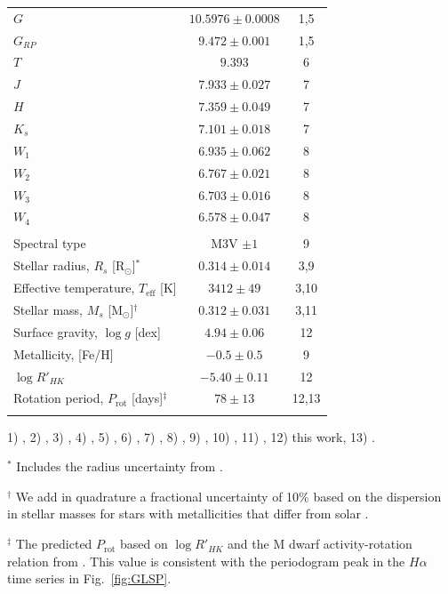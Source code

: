 \documentclass[longauth]{aa}
\newcommand{\prot}{$P_{\text{rot}}$}
\newcommand{\teff}{$T_{\text{eff}}$}
\begin{document}
\begin{table}[t]
\begin{tabular}{lcc}
    $G$ & $10.5976\pm 0.0008$ & 1,5 \\
    $G_{RP}$ & $9.472\pm 0.001$ & 1,5 \\
    $T$ & $9.393$ & 6 \\
    $J$ & $7.933\pm 0.027$ & 7 \\
    $H$ & $7.359\pm 0.049$ & 7 \\
    $K_s$ & $7.101\pm 0.018$ & 7 \\
    $W_1$ & $6.935\pm 0.062$ & 8 \\
    $W_2$ & $6.767\pm 0.021$ & 8 \\
    $W_3$ & $6.703\pm 0.016$ & 8 \\
    $W_4$ & $6.578\pm 0.047$ & 8 \\
    \noalign{\smallskip}
    \multicolumn{3}{c}{\emph{Stellar parameters}} \\
    Spectral type & M3V $\pm 1$ & 9 \\
    Stellar radius, $R_s$ [R$_{\odot}$]$^*$ & $0.314\pm 0.014$ & 3,9 \\
    Effective temperature, \teff{} [K] & $3412\pm 49$ & 3,10 \\
    Stellar mass, $M_s$ [M$_{\odot}$]$^{\dagger}$ & $0.312\pm 0.031$ & 3,11 \\
    Surface gravity, $\log{g}$ [dex] & $4.94\pm 0.06$ & 12 \\
    Metallicity, [Fe/H] & $-0.5\pm 0.5$ & 9 \\
    $\log{R'_{HK}}$ & $-5.40\pm 0.11$ & 12 \\
    Rotation period, \prot{} [days]$^{\ddagger}$ & $78\pm 13$ & 12,13 \\
    \hline\noalign{\smallskip}
  \end{tabular}
  
  \begin{list}{}{}
    \item 1) \citealt{gaia18}, 2) \citealt{lindegren18}, 3) \citealt{cloutier19b}, 4) \citealt{henden16}, 5) \citealt{evans18}, 6) \citealt{stassun17}, 7) \citealt{cutri03}, 8) \citealt{cutri13}, 9) \citealt{kostov19}, 10) \citealt{mann15}, 11) \citealt{benedict16}, 12) this work, 13) \citealt{astudillodefru17b}.
    \item $^*$ Includes the radius uncertainty from \citep{kostov19}. 
    \item $^{\dagger}$ We add in quadrature a fractional uncertainty of 10\% based on the dispersion in stellar masses for stars with metallicities that differ from solar \citep{mann19}.
    \item $^{\ddagger}$ The predicted \prot{} based on $\log{R'_{HK}}$ and the M dwarf activity-rotation relation from \cite{astudillodefru17b}. This value is consistent with the periodogram peak in the $H\alpha$ time series in Fig.~\ref{fig:GLSP}.
  \end{list}
\end{table}
\end{document}
